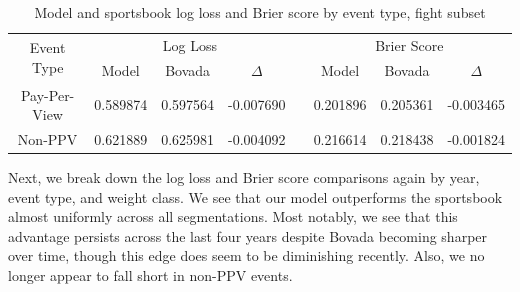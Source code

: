 \documentclass[12pt,twoside]{report}
\begin{document}
\begin{table}[!htb]
\centering
\begin{tabular}{@{}cccrcccr@{}}
\toprule
\multirow{2}{*}{Event Type} & \multicolumn{3}{c}{Log Loss}                       & \multirow{2}{*}{} & \multicolumn{3}{c}{Brier Score}                    \\ \cmidrule(lr){2-4} \cmidrule(l){6-8} 
                        & Model    & Bovada   & \multicolumn{1}{c}{$\Delta$} &                   & Model    & Bovada   & \multicolumn{1}{c}{$\Delta$} \\ \midrule
Pay-Per-View            & 0.589874 & 0.597564 & -0.007690                    &                   & 0.201896 & 0.205361 & -0.003465                    \\
Non-PPV             & 0.621889 & 0.625981 & -0.004092                     &                   & 0.216614 & 0.218438 & -0.001824                     \\ \bottomrule
\end{tabular}
\caption{Model and sportsbook log loss and Brier score by event type, fight subset}
\end{table}

Next, we break down the log loss and Brier score comparisons again by year, event type, and weight class. We see that our model outperforms the sportsbook almost uniformly across all segmentations. Most notably, we see that this advantage persists across the last four years despite Bovada becoming sharper over time, though this edge does seem to be diminishing recently. Also, we no longer appear to fall short in non-PPV events.
\end{document}
